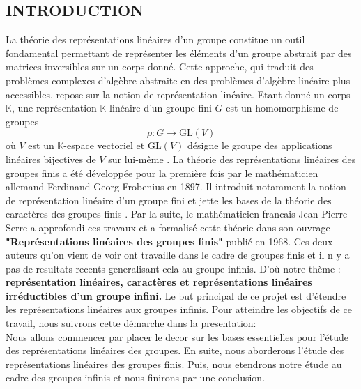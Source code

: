 \documentclass[a4paper, 14pt]{report}
\newcommand{\applyfontsize}{%
	\fontsize{12}{12}\selectfont
}
\begin{document}
\begin{onehalfspace}
		\chapter*{INTRODUCTION}
		{
			\applyfontsize %
La théorie des représentations linéaires d’un groupe constitue un outil fondamental permettant de représenter les éléments d’un groupe abstrait par des matrices inversibles sur un corps donné. Cette approche, qui traduit des problèmes complexes d’algèbre abstraite en des problèmes d’algèbre linéaire plus accessibles, repose sur la notion de représentation linéaire. Etant donné un corps $\mathbb{K}$, une représentation $\mathbb{K}$-linéaire d’un groupe fini $G$ est un homomorphisme de groupes \[ \rho : G \to \text{GL}(V) \]
où $V$ est un $\mathbb{K}$-espace vectoriel et $\text{GL}(V)$ désigne le groupe des applications linéaires bijectives de $V$ sur lui-même \cite{serre1971representation}. 
La théorie des représentations linéaires des groupes finis a été développée pour la première fois par le mathématicien allemand Ferdinand Georg Frobenius en 1897. Il introduit notamment la notion de représentation linéaire d’un groupe fini et jette les bases de la théorie des caractères des groupes finis \cite{minkowski1911gesammelte}. Par la suite, le mathématicien francais Jean-Pierre Serre a approfondi ces travaux et a formalisé cette théorie dans son ouvrage \textbf{"Représentations linéaires des groupes finis"} publié en 1968. Ces deux auteurs qu'on vient de voir ont travaille dans le cadre de groupes finis et il n y a pas de resultats recents generalisant cela au groupe infinis. D'où notre thème : \textbf{représentation linéaires, caractères et représentations linéaires irréductibles d'un groupe infini.}
Le but principal de ce projet est d’étendre les représentations linéaires aux groupes infinis.
Pour atteindre les objectifs de ce travail, nous suivrons cette démarche dans la presentation: \\
Nous allons commencer par placer le decor sur les bases essentielles pour l’étude des représentations linéaires des groupes. En suite, nous aborderons l’étude des représentations linéaires des groupes finis. Puis, nous etendrons notre étude au cadre des groupes infinis et nous finirons par une conclusion.
			
			
			
			
		}
		
		
		

\end{onehalfspace}
\end{document}
